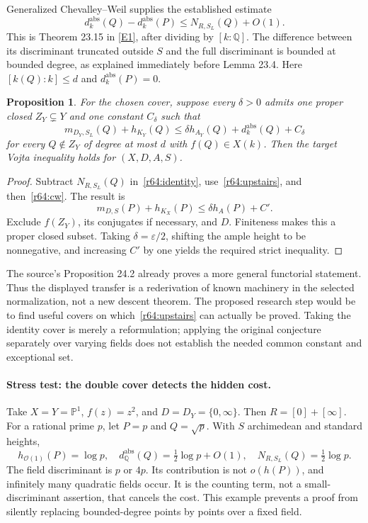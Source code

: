 \documentclass[11pt,a4paper]{article}
\newcommand{\Q}{\mathbb{Q}}
\newcommand{\PP}{\mathbb P}
\newcommand{\eps}{\varepsilon}
\newcommand{\eref}[2]{\hyperlink{extra:#1:#2}{[E#2]}}
\newtheorem{notebookproposition}[notebooklemma]{Proposition}
\numberwithin{equation}{section}
\begin{document}
Generalized Chevalley--Weil supplies the established estimate
\begin{equation}\label{r64:cw}
 d_k^{\mathrm{abs}}(Q)-d_k^{\mathrm{abs}}(P)
       \le N_{R,S_L}(Q)+O(1).
\end{equation}
This is Theorem 23.15 in \eref{64}{1}, after dividing by $[k:\Q]$. The difference between its discriminant truncated outside $S$ and the full discriminant is bounded at bounded degree, as explained immediately before Lemma 23.4. Here $[k(Q):k]\le d$ and $d_k^{\mathrm{abs}}(P)=0$.

\begin{notebookproposition}\label{r64:descent}
For the chosen cover, suppose every $\delta>0$ admits one proper closed $Z_Y\subsetneq Y$ and one constant $C_\delta$ such that
\begin{equation}\label{r64:upstairs}
 m_{D_Y,S_L}(Q)+h_{K_Y}(Q)
 \le\delta h_{A_Y}(Q)+d_k^{\mathrm{abs}}(Q)+C_\delta
\end{equation}
for every $Q\notin Z_Y$ of degree at most $d$ with $f(Q)\in X(k)$. Then the target Vojta inequality holds for $(X,D,A,S)$.
\end{notebookproposition}
\begin{proof}
Subtract $N_{R,S_L}(Q)$ in~\eqref{r64:identity}, use~\eqref{r64:upstairs}, and then~\eqref{r64:cw}. The result is
\[
 m_{D,S}(P)+h_{K_X}(P)\le\delta h_A(P)+C'.
\]
Exclude $f(Z_Y)$, its conjugates if necessary, and $D$. Finiteness makes this a proper closed subset. Taking $\delta=\eps/2$, shifting the ample height to be nonnegative, and increasing $C'$ by one yields the required strict inequality.
\end{proof}

The source's Proposition 24.2 already proves a more general functorial statement. Thus the displayed transfer is a rederivation of known machinery in the selected normalization, not a new descent theorem. The proposed research step would be to find useful covers on which~\eqref{r64:upstairs} can actually be proved. Taking the identity cover is merely a reformulation; applying the original conjecture separately over varying fields does not establish the needed common constant and exceptional set.

\paragraph{Stress test: the double cover detects the hidden cost.}
Take $X=Y=\PP^1$, $f(z)=z^2$, and $D=D_Y=\{0,\infty\}$. Then $R=[0]+[\infty]$. For a rational prime $p$, let $P=p$ and $Q=\sqrt p$. With $S$ archimedean and standard heights,
\[
 h_{\mathcal O(1)}(P)=\log p,\quad
 d_{\Q}^{\mathrm{abs}}(Q)=\tfrac12\log p+O(1),\quad
 N_{R,S_L}(Q)=\tfrac12\log p.
\]
The field discriminant is $p$ or $4p$. Its contribution is not $o(h(P))$, and infinitely many quadratic fields occur. It is the counting term, not a small-discriminant assertion, that cancels the cost. This example prevents a proof from silently replacing bounded-degree points by points over a fixed field.
\end{document}
